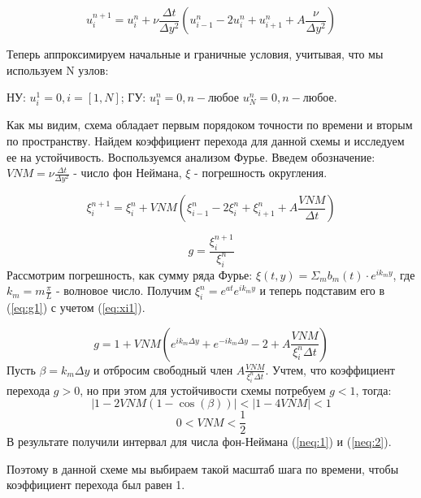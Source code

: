 \begin{equation}
    u_i^{n+1}=u_i^n+\nu \frac{\Delta t}{\Delta y^2} (u_{i-1}^n-2u_i^n+u^n_{i+1}+A\frac{\nu}{\Delta y^2})
\end{equation}

Теперь аппроксимируем начальные и граничные условия, учитывая, что мы используем N узлов:

НУ: $u^1_i = 0, i=[1,N]$; ГУ: $u^n_1 = 0, n - \text{любое} $ $u^n_N = 0, n - \text{любое}$.

Как мы видим, схема обладает первым порядоком точности по времени и вторым по пространству. Найдем коэффициент перехода для данной схемы и исследуем ее на устойчивость. Воспользуемся анализом Фурье. Введем обозначение: $VNM=\nu\frac{\Delta t}{\Delta y^2}$ - число фон Неймана, $\xi$ - погрешность округления.

\begin{equation}
    \xi_i^{n+1}=\xi^n_i+VNM(\xi_{i-1}^n-2\xi_i^n+\xi^n_{i+1}+A\frac{VNM}{\Delta t})
    \label{eq:xi1}
\end{equation}

\begin{equation}
    g=\frac{\xi_i^{n+1}}{\xi_i^{n}}
    \label{eq:g1}
\end{equation}
Рассмотрим погрешность, как сумму ряда Фурье: $\xi(t,y)=\Sigma_m b_m(t)\cdot e^{ik_my}$, где $k_m=m\frac{\pi}{L}$ - волновое число. Получим $\xi_i^n=e^{at}e^{ik_my}$ и теперь подставим его в (\ref{eq:g1}) с учетом (\ref{eq:xi1}).

\begin{equation}
    g=1+VNM(e^{ik_m\Delta y}+e^{-ik_m\Delta y}-2+A\frac{VNM}{\xi_i^{n}\Delta t})
\end{equation}
Пусть $\beta=k_m\Delta y$ и отбросим свободный член $A\frac{VNM}{\xi_i^{n}\Delta t}$. Учтем, что коэффициент перехода $g>0$, но при этом для устойчивости схемы потребуем $g<1$, тогда:
\begin{equation}
    |1-2VNM(1-\cos(\beta))|<|1-4VNM|<1
    \label{neq:1}
\end{equation}
\begin{equation}
    0<VNM<\frac{1}{2}
    \label{neq:2}
\end{equation}
В результате получили интервал для числа фон-Неймана (\ref{neq:1}) и (\ref{neq:2}).

Поэтому в данной схеме мы выбираем такой масштаб шага по времени, чтобы коэффициент перехода был равен 1.

